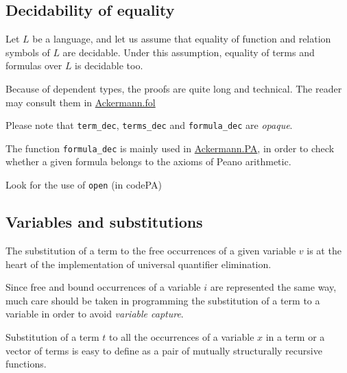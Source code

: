 \subsection{Decidability of equality}

Let $L$ be a language, and let us assume that equality 
of function and relation symbols of $L$ are decidable.
Under this assumption, equality of terms and formulas over $L$ is decidable too.

Because of dependent types, the proofs are quite long and technical. The reader may consult them in \href{../theories/html/hydras.Ackermann.fol.html}{Ackermann.fol}





\begin{remark}
Please note that \texttt{term\_dec}, \texttt{terms\_dec} and
\texttt{formula\_dec} are \emph{opaque}. 

The function \texttt{formula\_dec} is mainly used in
\href{../theories/html/hydras.Ackermann.PA.html}{Ackermann.PA}, in order to check whether a given formula belongs to the axioms of Peano arithmetic.

\begin{todo}
  Look for the use of \texttt{open}  (in codePA)
\end{todo}

\end{remark}


\subsection{Variables and substitutions}

The substitution of a term to the free occurrences of a given variable $v$ is at the heart of the implementation of universal
quantifier elimination. 

Since free and bound occurrences of a variable $i$ are represented the same way, much care should be taken in programming the substitution of a term to a variable in order to avoid \emph{variable capture}.

Substitution of a term $t$ to all the occurrences of a variable $x$ in a term or a vector of terms is easy to define as a pair of mutually structurally recursive functions.




